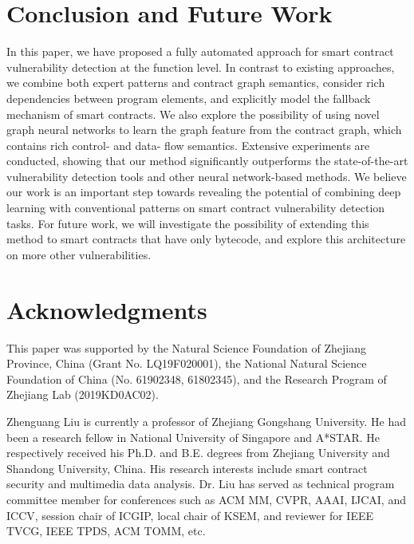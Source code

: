 \vspace{-0.7em}
\section{Conclusion and Future Work}
\label{conclusion}
In this paper, we have proposed a fully automated approach for smart contract vulnerability detection at the function level. In contrast to existing approaches, we combine both expert patterns and contract graph semantics, consider rich dependencies between program elements, and explicitly model the fallback mechanism of smart contracts. We also explore the possibility of using novel graph neural networks to learn the graph feature from the contract graph, which contains rich control- and data- flow semantics. Extensive experiments are conducted, showing that our method significantly outperforms the state-of-the-art vulnerability detection tools and other neural network-based methods. We believe our work is an important step towards revealing the potential of combining deep learning with conventional patterns on smart contract vulnerability detection tasks. For future work, we will investigate the possibility of extending this method to smart contracts that have only bytecode, and explore this architecture on more other vulnerabilities.

\vspace{-0.7em}
\section*{Acknowledgments}
This paper was supported by the Natural Science Foundation of Zhejiang Province, China (Grant No. LQ19F020001), the National Natural Science Foundation of China (No. 61902348, 61802345), and the Research Program of Zhejiang Lab (2019KD0AC02).

\ifCLASSOPTIONcaptionsoff
  \newpage
\fi

\footnotesize

\vspace{-4em}
\begin{IEEEbiography}{Zhenguang Liu}
is currently a professor of Zhejiang Gongshang University. He had been a research
fellow in National University of Singapore and A*STAR. %
He respectively received his Ph.D. and B.E. degrees from Zhejiang University
and Shandong University, China. His research interests include smart contract security and multimedia
data analysis. %
Dr. Liu
has served as technical program committee member for conferences
such as ACM MM, CVPR, AAAI, IJCAI, and ICCV, session chair of ICGIP, local chair of KSEM, and reviewer for IEEE TVCG, IEEE TPDS, ACM TOMM, etc.  %
\end{IEEEbiography}

